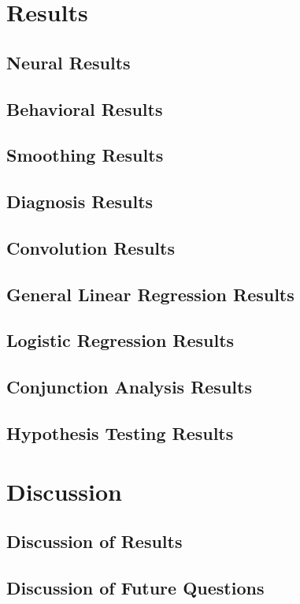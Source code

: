 \documentclass[11pt]{article}
\begin{document}
\section{Results}

    \subsection{Neural Results}
            
    \subsection{Behavioral Results}
            
    \subsection{Smoothing Results}
            
    \subsection{Diagnosis Results}
            
    \subsection{Convolution Results}
            
    \subsection{General Linear Regression Results}
            
    \subsection{Logistic Regression Results}
            
    \subsection{Conjunction Analysis Results}
            
    \subsection{Hypothesis Testing Results}
            

\section{Discussion}

    \subsection{Discussion of Results}
            
    \subsection{Discussion of Future Questions}
            


\end{document}
